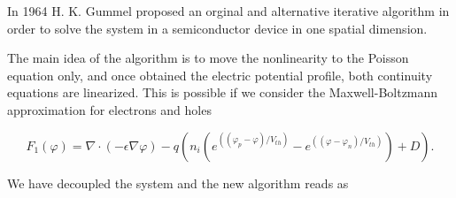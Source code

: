 In 1964 H. K. Gummel proposed an orginal and alternative iterative algorithm in order to solve the system  in a semiconductor device in one spatial dimension.

The main idea of the algorithm is to move the nonlinearity to the Poisson equation only, and once obtained the electric potential profile, both continuity equations are linearized. This is possible if we consider the Maxwell-Boltzmann approximation for electrons  and holes 

\begin{equation}
F_1(\varphi)  =  \nabla \cdot (-\epsilon \nabla \varphi) - q(n_i(e^{((\varphi_p-\varphi)/V_{th})}-e^{((\varphi-\varphi_n)/V_{th})})+D) .
\end{equation}


We have decoupled the system and the new algorithm reads as



